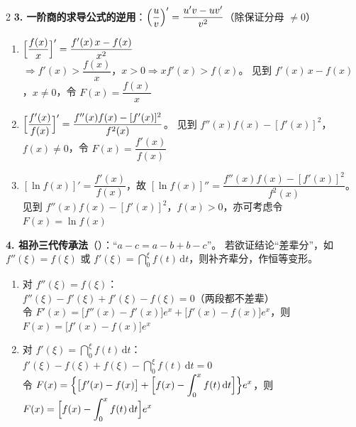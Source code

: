 \documentclass[a4paper,11pt]{article}
\begin{document}
\begin{multicols}{2}
\textbf{3. 一阶商的求导公式的逆用}：$\Bigl(\dfrac{u}{v}\Bigr)' = \dfrac{u'v - uv'}{v^{2}}$（除保证分母 $\ne 0$）
        \begin{enumerate}[label=(\arabic*), leftmargin=2em, itemsep=0.55em]
            \item $\Bigl[\dfrac{f(x)}{x}\Bigr]' = \dfrac{f'(x)\,x - f(x)}{x^{2}}$\quad{\color{red}{（重要）}}
            \\$\Rightarrow f'(x) > \dfrac{f(x)}{x}$，$x > 0 \Rightarrow xf'(x) > f(x)$。
            见到 $f'(x)\,x - f(x)$，$x \ne 0$，令 $F(x) = \dfrac{f(x)}{x}$
            \item $\Bigl[\dfrac{f'(x)}{f(x)}\Bigr]' = \dfrac{f''(x)f(x) - [f'(x)]^{2}}{f^{2}(x)}$。
            见到 $f''(x)f(x) - [f'(x)]^{2}$，$f(x) \ne 0$，令 $F(x) = \dfrac{f'(x)}{f(x)}$
            \item $[\ln f(x)]' = \dfrac{f'(x)}{f(x)}$，故 $[\ln f(x)]'' = \dfrac{f''(x)f(x) - [f'(x)]^{2}}{f^{2}(x)}$。
            见到 $f''(x)f(x) - [f'(x)]^{2}$，$f(x) > 0$，亦可考虑令 $F(x) = \ln f(x)$
        \end{enumerate}
\vspace{0.6em}

\textbf{4. 祖孙三代传承法}（{\color{red}{恒等变换要求高}}）：``$a - c = a - b + b - c$''。
        若欲证结论``差辈分''，如 $f''(\xi) = f(\xi)$ 或 $f'(\xi) = \dint_{0}^{\xi} f(t)\,\mathrm{d}t$，则补齐辈分，作恒等变形。
        \begin{enumerate}[label=(\arabic*), leftmargin=2em, itemsep=0.65em]
            \item 对 $f''(\xi) = f(\xi)$：
            \\$f''(\xi) - f'(\xi) + f'(\xi) - f(\xi) = 0$（两段都不差辈）
            \\令 $F'(x) = \bigl[f''(x) - f'(x)\bigr]e^{x} + \bigl[f'(x) - f(x)\bigr]e^{x}$，则
            \\$F(x) = \bigl[f'(x) - f(x)\bigr]e^{x}$
            \item 对 $f'(\xi) = \dint_{0}^{\xi} f(t)\,\mathrm{d}t$：
            \\$f'(\xi) - f(\xi) + f(\xi) - \dint_{0}^{\xi} f(t)\,\mathrm{d}t = 0$
            \\令 $F(x) = \Bigl\{\bigl[f'(x) - f(x)\bigr] + \Bigl[f(x) - \displaystyle\int_{0}^{x} f(t)\,\mathrm{d}t\Bigr]\Bigr\}e^{x}$，则
            \\$F(x) = \Bigl[f(x) - \displaystyle\int_{0}^{x} f(t)\,\mathrm{d}t\Bigr]e^{x}$
        \end{enumerate}
\vspace{0.6em}


\end{multicols}
\end{document}
